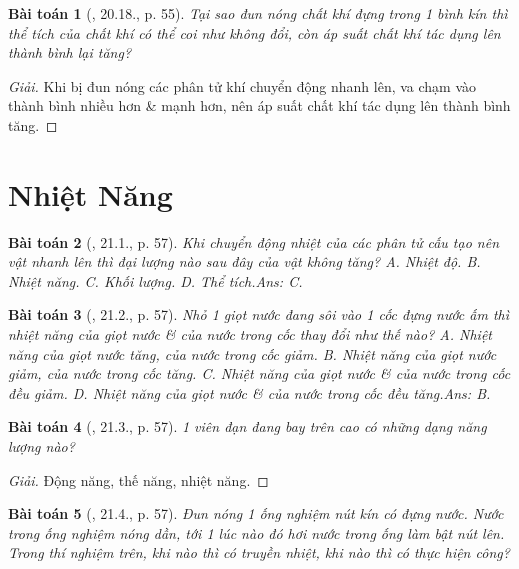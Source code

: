 \documentclass{article}
\newtheorem{baitoan}{Bài toán}
\begin{document}
\begin{baitoan}[\cite{SBT_Vat_Ly_8}, 20.18., p. 55]
	Tại sao đun nóng chất khí đựng trong 1 bình kín thì thể tích của chất khí có thể coi như không đổi, còn áp suất chất khí tác dụng lên thành bình lại tăng?
\end{baitoan}

\begin{proof}[Giải]
	Khi bị đun nóng các phân tử khí chuyển động nhanh lên, va chạm vào thành bình nhiều hơn \& mạnh hơn, nên áp suất chất khí tác dụng lên thành bình tăng.
\end{proof}


\section{Nhiệt Năng}

\begin{baitoan}[\cite{SBT_Vat_Ly_8}, 21.1., p. 57]
	Khi chuyển động nhiệt của các phân tử cấu tạo nên vật nhanh lên thì đại lượng nào sau đây của vật không tăng? {\sf A.} Nhiệt độ. {\sf B.} Nhiệt năng. {\sf C.} Khối lượng. {\sf D.} Thể tích.\hfill{\sf Ans: C.}
\end{baitoan}

\begin{baitoan}[\cite{SBT_Vat_Ly_8}, 21.2., p. 57]
	Nhỏ 1 giọt nước đang sôi vào 1 cốc đựng nước ấm thì nhiệt năng của giọt nước \& của nước trong cốc thay đổi như thế nào? {\sf A.} Nhiệt năng của giọt nước tăng, của nước trong cốc giảm. {\sf B.} Nhiệt năng của giọt nước giảm, của nước trong cốc tăng. {\sf C.} Nhiệt năng của giọt nước \& của nước trong cốc đều giảm. {\sf D.} Nhiệt năng của giọt nước \& của nước trong cốc đều tăng.\hfill{\sf Ans: B.}
\end{baitoan}

\begin{baitoan}[\cite{SBT_Vat_Ly_8}, 21.3., p. 57]
	1 viên đạn đang bay trên cao có những dạng năng lượng nào?
\end{baitoan}

\begin{proof}[Giải]
	Động năng, thế năng, nhiệt năng.
\end{proof}

\begin{baitoan}[\cite{SBT_Vat_Ly_8}, 21.4., p. 57]
	Đun nóng 1 ống nghiệm nút kín có đựng nước. Nước trong ống nghiệm nóng dần, tới 1 lúc nào đó hơi nước trong ống làm bật nút lên. Trong thí nghiệm trên, khi nào thì có truyền nhiệt, khi nào thì có thực hiện công? 
\end{baitoan}
\end{document}

